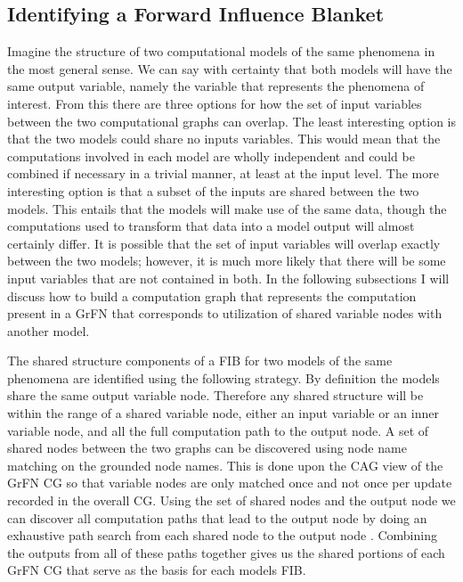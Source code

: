 \subsection{Identifying a Forward Influence Blanket\label{sec:fib_creation}}
Imagine the structure of two computational models of the same phenomena in the most general sense. We can say with certainty that both models will have the same output variable, namely the variable that represents the phenomena of interest. From this there are three options for how the set of input variables between the two computational graphs can overlap. The least interesting option is that the two models could share no inputs variables. This would mean that the computations involved in each model are wholly independent and could be combined if necessary in a trivial manner, at least at the input level. The more interesting option is that a subset of the inputs are shared between the two models. This entails that the models will make use of the same data, though the computations used to transform that data into a model output will almost certainly differ. It is possible that the set of input variables will overlap exactly between the two models; however, it is much more likely that there will be some input variables that are not contained in both. In the following subsections I will discuss how to build a computation graph that represents the computation present in a GrFN that corresponds to utilization of shared variable nodes with another model.

The shared structure components of a FIB for two models of the same phenomena are identified using the following strategy.
By definition the models share the same output variable node.
Therefore any shared structure will be within the range of a shared variable node, either an input variable or an inner variable node, and all the full computation path to the output node.
A set of shared nodes between the two graphs can be discovered using node name matching on the grounded node names.
This is done upon the CAG view of the GrFN CG so that variable nodes are only matched once and not once per update recorded in the overall CG.
Using the set of shared nodes and the output node we can discover all computation paths that lead to the output node by doing an exhaustive path search from each shared node to the output node \citep{sedgewick2002algorithmsInC}.
Combining the outputs from all of these paths together gives us the shared portions of each GrFN CG that serve as the basis for each models FIB.

